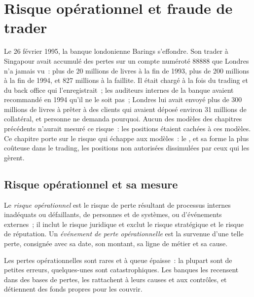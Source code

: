 \chapter{Risque opérationnel et fraude de trader}\label{ch:rc:operational-risk-and-rogue-trading}

Le 26 février 1995, la banque londonienne Barings s'effondre. Son trader à Singapour avait accumulé des pertes sur un compte numéroté 88888 que Londres n'a jamais vu~: plus de
20 millions de livres à la fin de 1993, plus de 200 millions à la fin de 1994, et 827 millions à
la faillite. Il était chargé à la fois du trading et du back office qui l'enregistrait~; les auditeurs internes de la banque
avaient recommandé en 1994 qu'il ne le soit pas~; Londres lui avait envoyé plus de 300
millions de livres à prêter à des clients qui avaient déposé environ 31 millions de collatéral, et personne ne demanda
pourquoi. Aucun des modèles des chapitres précédents n'aurait mesuré ce risque~: les positions étaient
cachées à ces modèles. Ce chapitre porte sur le risque qui échappe aux modèles~: le , et
sa forme la plus coûteuse dans le trading, les positions non autorisées dissimulées par ceux qui les gèrent.

\section{Risque opérationnel et sa mesure}

\begin{definition}\label{def:rc:operational-risk-and-rogue-trading:oprisk}
Le \emph{risque opérationnel} est le risque de perte résultant de processus internes
inadéquats ou défaillants, de personnes et de systèmes, ou d'événements externes~; il inclut le risque juridique et
exclut le risque stratégique et le risque de réputation. Un \emph{événement de perte opérationnelle}
est la survenue d'une telle perte, consignée avec sa date, son montant, sa ligne de métier et sa cause.
\end{definition}

Les pertes opérationnelles sont rares et à queue épaisse~: la plupart sont de petites erreurs, quelques-unes sont catastrophiques. Les banques
les recensent dans des bases de pertes, les rattachent à leurs causes et aux contrôles, et détiennent des fonds propres pour les couvrir.

